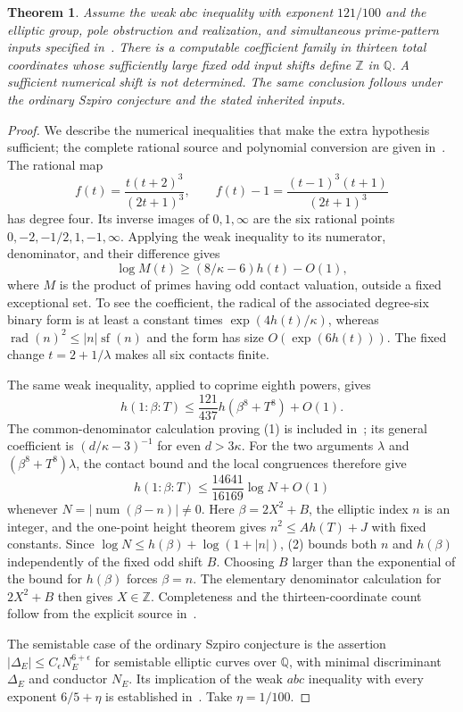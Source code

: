 \documentclass[11pt,a4paper]{article}
\newtheorem{theorem}{Theorem}
\newcommand{\Q}{\mathbb Q}\newcommand{\Z}{\mathbb Z}
\DeclareMathOperator{\rad}{rad}
\DeclareMathOperator{\sfpart}{sf}
\begin{document}
\begin{theorem}\label{thm:weak}
Assume the weak $abc$ inequality with exponent $121/100$ and the
elliptic group, pole obstruction and realization, and simultaneous
prime-pattern inputs specified in~\cite{Thirteen}.
There is a computable coefficient family in thirteen total
coordinates whose sufficiently large fixed odd input shifts define
$\Z$ in $\Q$. A sufficient numerical shift is not determined.
The same conclusion follows under the ordinary Szpiro conjecture
and the stated inherited inputs.
\end{theorem}
\begin{proof}
We describe the numerical inequalities that make the extra
hypothesis sufficient; the complete rational source and polynomial
conversion are given in~\cite{Thirteen}. The rational map
\[
 f(t)=\frac{t(t+2)^3}{(2t+1)^3},
 \qquad
 f(t)-1=\frac{(t-1)^3(t+1)}{(2t+1)^3}
\]
has degree four. Its inverse images of $0,1,\infty$ are the
six rational points $0,-2,-1/2,1,-1,\infty$.
Applying the weak inequality to its numerator, denominator, and
their difference gives
\[
 \log M(t)\ge(8/\kappa-6)h(t)-O(1),
\]
where $M$ is the product of primes having odd contact valuation,
outside a fixed exceptional set. To see the coefficient, the
radical of the associated degree-six binary form is at least a
constant times $\exp(4h(t)/\kappa)$, whereas
$\rad(n)^2\le |n|\sfpart(n)$ and the form has size
$O(\exp(6h(t)))$. The fixed change $t=2+1/\lambda$ makes all
six contacts finite.

The same weak inequality, applied to coprime eighth powers, gives
\[
 h(1:\beta:T)\le\frac{121}{437}h(\beta^8+T^8)+O(1).
 \tag{1}
\]
The common-denominator calculation proving (1) is included
in~\cite{Thirteen}; its general coefficient is
$(d/\kappa-3)^{-1}$ for even $d>3\kappa$.
For the two arguments $\lambda$ and $(\beta^8+T^8)\lambda$,
the contact bound and the local congruences therefore give
\[
 h(1:\beta:T)\le
 \frac{14641}{16169}\log N+O(1)
 \tag{2}
\]
whenever $N=|\operatorname{num}(\beta-n)|\ne0$.
Here $\beta=2X^2+B$, the elliptic index $n$ is an integer,
and the one-point height theorem gives $n^2\le A h(T)+J$
with fixed constants. Since
$\log N\le h(\beta)+\log(1+|n|)$, (2) bounds both $n$ and
$h(\beta)$ independently of the fixed odd shift $B$.
Choosing $B$ larger than the exponential of the bound for
$h(\beta)$ forces $\beta=n$.
The elementary denominator calculation for $2X^2+B$ then gives
$X\in\Z$. Completeness and the thirteen-coordinate count follow
from the explicit source in~\cite{Thirteen}.

The semistable case of the ordinary Szpiro conjecture is the assertion
$|\Delta_E|\le C_\epsilon N_E^{6+\epsilon}$
for semistable elliptic curves over $\Q$, with minimal
discriminant $\Delta_E$ and conductor $N_E$.
Its implication of the weak $abc$ inequality with every exponent
$6/5+\eta$ is established in~\cite[\S I.3]{Oesterle}.
Take $\eta=1/100$.
\end{proof}
\end{document}
